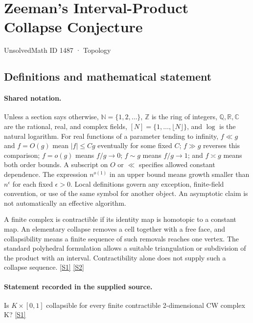 \documentclass[11pt,a4paper]{article}
\newcommand{\N}{\mathbb{N}}
\newcommand{\Z}{\mathbb{Z}}
\newcommand{\Q}{\mathbb{Q}}
\newcommand{\R}{\mathbb{R}}
\newcommand{\C}{\mathbb{C}}
\newcommand{\sref}[2]{\hyperlink{source:#1:#2}{[S#2]}}
\begin{document}

\setcounter{section}{1486}

\section{Zeeman’s Interval-Product Collapse Conjecture}\label{1487}

{\small\sffamily UnsolvedMath ID 1487 · Topology}

\subsection{Definitions and mathematical statement}

\paragraph{Shared notation.}Unless a section says otherwise, $\N=\{1,2,\ldots\}$,
$\Z$ is the ring of integers, $\Q,\R,\C$ are the rational, real, and complex
fields, $[N]=\{1,\ldots,\lfloor N\rfloor\}$, and $\log$ is the natural
logarithm. For real functions of a parameter tending to infinity,
$f\ll g$ and $f=O(g)$ mean $|f|\leq Cg$ eventually for some fixed $C$;
$f\gg g$ reverses this comparison; $f=o(g)$ means $f/g\to0$;
$f\sim g$ means $f/g\to1$; and $f\asymp g$ means both order bounds.
A subscript on $O$ or $\ll$ specifies allowed constant dependence.
The expression $n^{o(1)}$ in an upper bound means growth smaller than
$n^\epsilon$ for each fixed $\epsilon>0$. Local definitions govern any
exception, finite-field convention, or use of the same symbol for another
object. An asymptotic claim is not automatically an effective algorithm.



A finite complex is contractible if its identity map is homotopic to a constant map. An elementary collapse removes a cell together with a free face, and collapsibility means a finite sequence of such removals reaches one vertex. The standard polyhedral formulation allows a suitable triangulation or subdivision of the product with an interval. Contractibility alone does not supply such a collapse sequence. \sref{1487}{1} \sref{1487}{2}

\paragraph{Statement recorded in the supplied source.}
Is $K \times [0,1]$ collapsible for every finite contractible 2-dimensional CW complex K? \sref{1487}{1}
\end{document}
